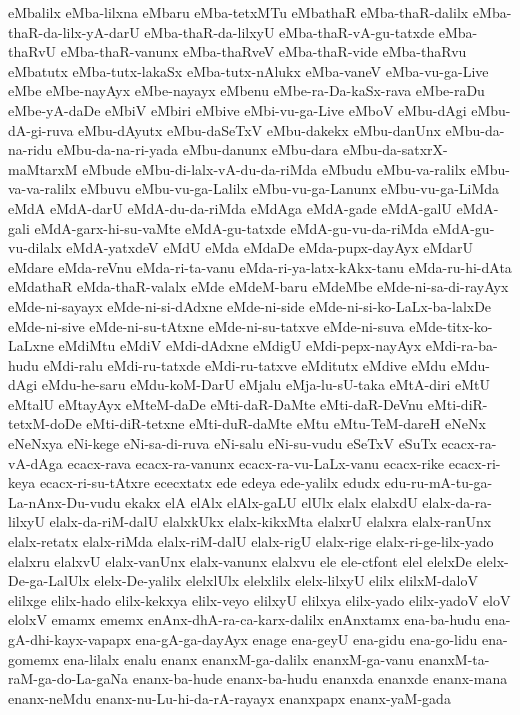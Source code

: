 {eMbalilx
eMba-lilxna
eMbaru
eMba-tetxMTu
eMbathaR
eMba-thaR-dalilx
eMba-thaR-da-lilx-yA-darU
eMba-thaR-da-lilxyU
eMba-thaR-vA-gu-tatxde
eMba-thaRvU
eMba-thaR-vanunx
eMba-thaRveV
eMba-thaR-vide
eMba-thaRvu
eMbatutx
eMba-tutx-lakaSx
eMba-tutx-nAlukx
eMba-vaneV
eMba-vu-ga-Live
eMbe
eMbe-nayAyx
eMbe-nayayx
eMbenu
eMbe-ra-Da-kaSx-rava
eMbe-raDu
eMbe-yA-daDe
eMbiV
eMbiri
eMbive
eMbi-vu-ga-Live
eMboV
eMbu-dAgi
eMbu-dA-gi-ruva
eMbu-dAyutx
eMbu-daSeTxV
eMbu-dakekx
eMbu-danUnx
eMbu-da-na-ridu
eMbu-da-na-ri-yada
eMbu-danunx
eMbu-dara
eMbu-da-satxrX-maMtarxM
eMbude
eMbu-di-lalx-vA-du-da-riMda
eMbudu
eMbu-va-ralilx
eMbu-va-va-ralilx
eMbuvu
eMbu-vu-ga-Lalilx
eMbu-vu-ga-Lanunx
eMbu-vu-ga-LiMda
eMdA
eMdA-darU
eMdA-du-da-riMda
eMdAga
eMdA-gade
eMdA-galU
eMdA-gali
eMdA-garx-hi-su-vaMte
eMdA-gu-tatxde
eMdA-gu-vu-da-riMda
eMdA-gu-vu-dilalx
eMdA-yatxdeV
eMdU
eMda
eMdaDe
eMda-pupx-dayAyx
eMdarU
eMdare
eMda-reVnu
eMda-ri-ta-vanu
eMda-ri-ya-latx-kAkx-tanu
eMda-ru-hi-dAta
eMdathaR
eMda-thaR-valalx
eMde
eMdeM-baru
eMdeMbe
eMde-ni-sa-di-rayAyx
eMde-ni-sayayx
eMde-ni-si-dAdxne
eMde-ni-side
eMde-ni-si-ko-LaLx-ba-lalxDe
eMde-ni-sive
eMde-ni-su-tAtxne
eMde-ni-su-tatxve
eMde-ni-suva
eMde-titx-ko-LaLxne
eMdiMtu
eMdiV
eMdi-dAdxne
eMdigU
eMdi-pepx-nayAyx
eMdi-ra-ba-hudu
eMdi-ralu
eMdi-ru-tatxde
eMdi-ru-tatxve
eMditutx
eMdive
eMdu
eMdu-dAgi
eMdu-he-saru
eMdu-koM-DarU
eMjalu
eMja-lu-sU-taka
eMtA-diri
eMtU
eMtalU
eMtayAyx
eMteM-daDe
eMti-daR-DaMte
eMti-daR-DeVnu
eMti-diR-tetxM-doDe
eMti-diR-tetxne
eMti-duR-daMte
eMtu
eMtu-TeM-dareH
eNeNx
eNeNxya
eNi-kege
eNi-sa-di-ruva
eNi-salu
eNi-su-vudu
eSeTxV
eSuTx
ecacx-ra-vA-dAga
ecacx-rava
ecacx-ra-vanunx
ecacx-ra-vu-LaLx-vanu
ecacx-rike
ecacx-ri-keya
ecacx-ri-su-tAtxre
ececxtatx
ede
edeya
ede-yalilx
edudx
edu-ru-mA-tu-ga-La-nAnx-Du-vudu
ekakx
elA
elAlx
elAlx-gaLU
elUlx
elalx
elalxdU
elalx-da-ra-lilxyU
elalx-da-riM-dalU
elalxkUkx
elalx-kikxMta
elalxrU
elalxra
elalx-ranUnx
elalx-retatx
elalx-riMda
elalx-riM-dalU
elalx-rigU
elalx-rige
elalx-ri-ge-lilx-yado
elalxru
elalxvU
elalx-vanUnx
elalx-vanunx
elalxvu
ele
ele-ctfont
elel
elelxDe
elelx-De-ga-LalUlx
elelx-De-yalilx
elelxlUlx
elelxlilx
elelx-lilxyU
elilx
elilxM-daloV
elilxge
elilx-hado
elilx-kekxya
elilx-veyo
elilxyU
elilxya
elilx-yado
elilx-yadoV
eloV
elolxV
emamx
ememx
enAnx-dhA-ra-ca-karx-dalilx
enAnxtamx
ena-ba-hudu
ena-gA-dhi-kayx-vapapx
ena-gA-ga-dayAyx
enage
ena-geyU
ena-gidu
ena-go-lidu
ena-gomemx
ena-lilalx
enalu
enanx
enanxM-ga-dalilx
enanxM-ga-vanu
enanxM-ta-raM-ga-do-La-gaNa
enanx-ba-hude
enanx-ba-hudu
enanxda
enanxde
enanx-mana
enanx-neMdu
enanx-nu-Lu-hi-da-rA-rayayx
enanxpapx
enanx-yaM-gada
}
